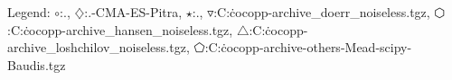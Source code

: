 Legend: {\color{NavyBlue}$\circ$}:.\DFO, {\color{Magenta}$\diamondsuit$}:.\DTS-CMA-ES-Pitra, {\color{Orange}$\star$}:.\Spearmint, {\color{CornflowerBlue}$\triangledown$}:C:\Users\dimo\.cocopp\data-archive\bbob{}\NELDERDOERR\_doerr\_noiseless.tgz, {\color{red}$\varhexagon$}:C:\Users\dimo\.cocopp\data-archive\bbob{}\NELDER\_hansen\_noiseless.tgz, {\color{YellowGreen}$\triangle$}:C:\Users\dimo\.cocopp\data-archive\bbob{}\HCMA\_loshchilov\_noiseless.tgz, {\color{cyan}$\pentagon$}:C:\Users\dimo\.cocopp\data-archive\bbob{}-others\Nelder-Mead-scipy-Baudis.tgz